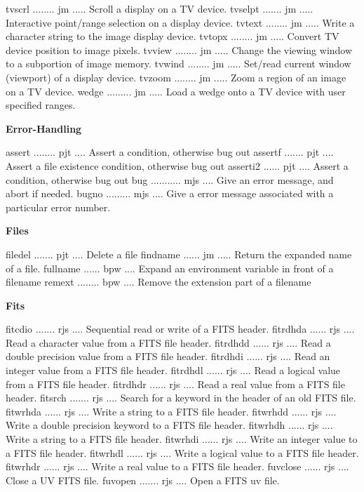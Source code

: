 {\eightpoint\begintt
tvscrl ........ jm ..... Scroll a display on a TV device.
tvselpt ....... jm ..... Interactive point/range selection on a display device.
tvtext ........ jm ..... Write a character string to the image display device.
tvtopx ........ jm ..... Convert TV device position to image pixels.
tvview ........ jm ..... Change the viewing window to a subportion of image memory.
\endtt}
{\eightpoint\begintt
tvwind ........ jm ..... Set/read current window (viewport) of a display device.
tvzoom ........ jm ..... Zoom a region of an image on a TV device.
wedge ......... jm ..... Load a wedge onto a TV device with user specified ranges.
\endtt}
\par\centerline{\bf Error-Handling}
{\eightpoint\begintt
assert ........ pjt .... Assert a condition, otherwise bug out
assertf ....... pjt .... Assert a file existence condition, otherwise bug out
asserti2 ...... pjt .... Assert a condition, otherwise bug out
bug ........... mjs .... Give an error message, and abort if needed.
bugno ......... mjs .... Give a error message associated with a particular error number.
\endtt}
\par\centerline{\bf Files}
{\eightpoint\begintt
filedel ....... pjt .... Delete a file
findname ...... jm ..... Return the expanded name of a file.
fullname ...... bpw .... Expand an environment variable in front of a filename
remext ........ bpw .... Remove the extension part of a filename
\endtt}
\par\centerline{\bf Fits}
{\eightpoint\begintt
fitcdio ....... rjs .... Sequential read or write of a FITS header.
fitrdhda ...... rjs .... Read a character value from a FITS file header.
fitrdhdd ...... rjs .... Read a double precision value from a FITS file header.
fitrdhdi ...... rjs .... Read an integer value from a FITS file header.
fitrdhdl ...... rjs .... Read a logical value from a FITS file header.
\endtt}
{\eightpoint\begintt
fitrdhdr ...... rjs .... Read a real value from a FITS file header.
fitsrch ....... rjs .... Search for a keyword in the header of an old FITS file.
fitwrhda ...... rjs .... Write a string to a FITS file header.
fitwrhdd ...... rjs .... Write a double precision keyword to a FITS file header.
fitwrhdh ...... rjs .... Write a string to a FITS file header.
\endtt}
{\eightpoint\begintt
fitwrhdi ...... rjs .... Write an integer value to a FITS file header.
fitwrhdl ...... rjs .... Write a logical value to a FITS file header.
fitwrhdr ...... rjs .... Write a real value to a FITS file header.
fuvclose ...... rjs .... Close a UV FITS file.
fuvopen ....... rjs .... Open a FITS uv file.
\endtt}
